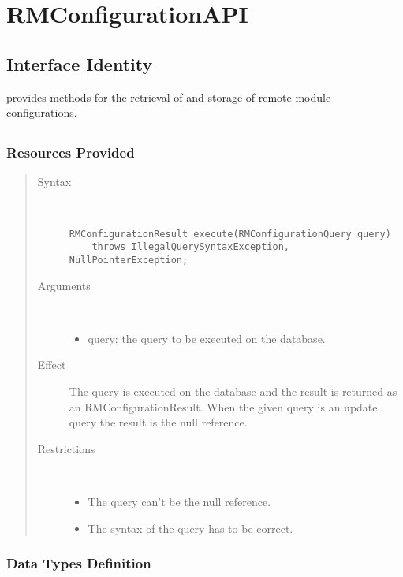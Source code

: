 \section{RMConfigurationAPI}
\label{api:rm-configuration-api}

\subsection{Interface Identity}

\npar {} provides methods for the retrieval of and
storage of remote module configurations.

\subsection{}

\subsubsection{Resources Provided}

\begin{quote}
	\begin{description}
		\item[Syntax] \
		\begin{verbatim}
RMConfigurationResult execute(RMConfigurationQuery query)
    throws IllegalQuerySyntaxException, NullPointerException;
		\end{verbatim}
		\item[Arguments] \
		\begin{itemize}
		  \item query: the query to be executed on the database. 
		\end{itemize}
		\item[Effect] The query is executed on the database and the result is returned
		as an RMConfigurationResult. When the given query is an update query the result is the
		null reference.
		\item[Restrictions] \
		\begin{itemize}
		  \item The query can't be the null reference.
		  \item The syntax of the query has to be correct.
		\end{itemize}
	\end{description} 
\end{quote}

\subsubsection{Data Types Definition}

